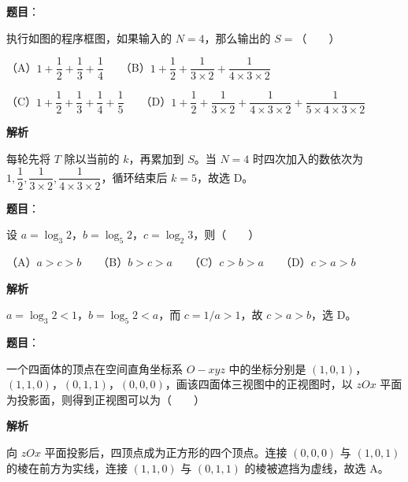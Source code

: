 \begin{answer}

\textbf{题目}：

执行如图的程序框图，如果输入的 $N=4$，那么输出的 $S=$\mbox{（　　）}
\nopagebreak[4]
\begin{center}\end{center}
\nopagebreak[4]
（A）$1+\dfrac12+\dfrac13+\dfrac14$　　（B）$1+\dfrac12+\dfrac1{3\times2}+\dfrac1{4\times3\times2}$

（C）$1+\dfrac12+\dfrac13+\dfrac14+\dfrac15$　　（D）$1+\dfrac12+\dfrac1{3\times2}+\dfrac1{4\times3\times2}+\dfrac1{5\times4\times3\times2}$

\textbf{解析}

每轮先将 $T$ 除以当前的 $k$，再累加到 $S$。当 $N=4$ 时四次加入的数依次为 $1,\dfrac12,\dfrac1{3\times2},\dfrac1{4\times3\times2}$，循环结束后 $k=5$，故选 D。


\end{answer}
\begin{answer}

\textbf{题目}：

设 $a=\log_3 2$，$b=\log_5 2$，$c=\log_2 3$，则\mbox{（　　）}

（A）$a>c>b$　　（B）$b>c>a$　　（C）$c>b>a$　　（D）$c>a>b$

\textbf{解析}

$a=\log_3 2<1$，$b=\log_5 2<a$，而 $c=1/a>1$，故 $c>a>b$，选 D。


\end{answer}
\begin{answer}

\textbf{题目}：

一个四面体的顶点在空间直角坐标系 $O-xyz$ 中的坐标分别是 $(1,0,1)$，$(1,1,0)$，$(0,1,1)$，$(0,0,0)$，画该四面体三视图中的正视图时，以 $zOx$ 平面为投影面，则得到正视图可以为\mbox{（　　）}
\nopagebreak[4]
\begin{center}\end{center}
\nopagebreak[4]
\textbf{解析}

向 $zOx$ 平面投影后，四顶点成为正方形的四个顶点。连接 $(0,0,0)$ 与 $(1,0,1)$ 的棱在前方为实线，连接 $(1,1,0)$ 与 $(0,1,1)$ 的棱被遮挡为虚线，故选 A。


\end{answer}
